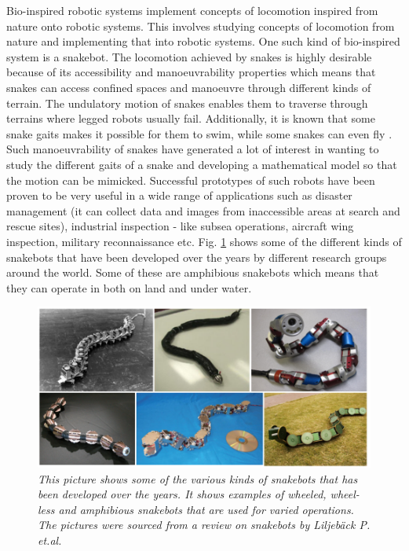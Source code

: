 \documentclass[a4paper,12pt]{report}
\begin{document}
Bio-inspired robotic systems implement concepts of locomotion inspired from nature onto robotic systems. This involves studying concepts of locomotion from nature and implementing that into robotic systems. One such kind of bio-inspired system is a snakebot. The locomotion achieved by snakes is highly desirable because of its accessibility and manoeuvrability properties which means that snakes can access confined spaces and manoeuvre through different kinds of terrain. The undulatory motion of snakes enables them to traverse through terrains where legged robots usually fail. Additionally, it is known that some snake gaits makes it possible for them to swim, while some snakes can even fly \cite{pettersen2017snake}. Such manoeuvrability of snakes have generated a lot of interest in wanting to study the different gaits of a snake and developing a mathematical model so that the motion can be mimicked. Successful prototypes of such robots have been proven to be very useful in a wide range of applications such as disaster management (it can collect data and images from inaccessible areas at search and rescue sites), industrial inspection - like subsea operations, aircraft wing inspection, military reconnaissance etc. Fig. \ref{snakebots-fig} shows some of the different kinds of snakebots that have been developed over the years by different research groups around the world. Some of these are amphibious snakebots which means that they can operate in both on land and under water.
\begin{figure}[h]
	\centering
	\includegraphics[width=\textwidth]{images/Intro-pic1.png}
	\caption{\textit{This picture shows some of the various kinds of snakebots that has been developed over the years. It shows examples of wheeled, wheel-less and amphibious snakebots that are used for varied operations. The pictures were sourced from a review on snakebots by Liljeb{\"a}ck P. et.al. \cite{liljeback2012review}}}
	\label{snakebots-fig}
\end{figure}
\end{document}
